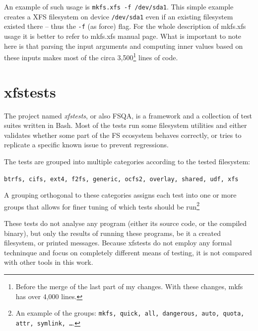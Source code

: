 An example of such usage is {\tt mkfs.xfs -f /dev/sda1}. This simple example creates a XFS filesystem on device {\tt /dev/sda1} even if an existing filesystem existed there -- thus the {\tt -f} (as force) flag. For the whole description of mkfs.xfs usage it is better to refer to mkfs.xfs manual page. What is important to note here is that parsing the input arguments and computing inner values based on these inputs makes most of the circa 3,500\footnote{Before the merge of the last part of my changes. With these changes, mkfs has over 4,000 lines.} lines of code.


\section{xfstests}\label{chap:xfs:xfstests}

The project named {\em xfstests}, or also FSQA, is a framework and a
collection of test suites written in Bash. Most of the tests run some
filesystem utilities and either validates whether some part of the FS
ecosystem behaves correctly, or tries to replicate a specific known issue
to prevent regressions.

The tests are grouped into multiple categories according to the tested filesystem:

{\tt btrfs, cifs, ext4, f2fs, generic, ocfs2, overlay, shared, udf, xfs}

A grouping orthogonal to these categories assigns each test into one or
more groups that allows for finer tuning of which tests should be
run\footnote{An example of the groups: {\tt mkfs, quick, all, dangerous,
auto, quota, attr, symlink, \ldots}.}

These tests do not analyse any program (either its source code, or the
compiled binary), but only the results of running these programs, be it a
created filesystem, or printed messages. Because xfstests do not employ any
formal techninque and focus on completely different means of testing, it is
not compared with other tools in this work.
